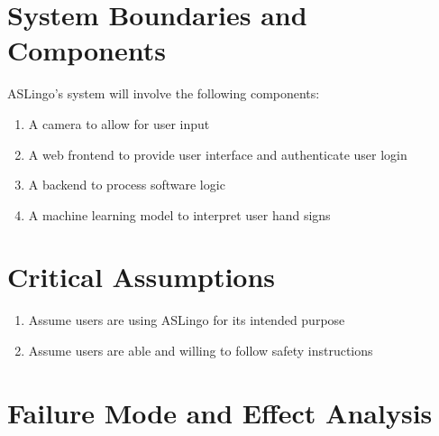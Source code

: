 \documentclass{article}
\begin{document}
\section{System Boundaries and Components}
ASLingo's system will involve the following components:
\begin{enumerate}
    \item A camera to allow for user input
    \item A web frontend to provide user interface and authenticate user login
    \item A backend to process software logic
    \item A machine learning model to interpret user hand signs
\end{enumerate}

\section{Critical Assumptions}

\begin{enumerate}
    \item Assume users are using ASLingo for its intended purpose
    \item Assume users are able and willing to follow safety instructions
\end{enumerate}

\section{Failure Mode and Effect Analysis}
\end{document}
